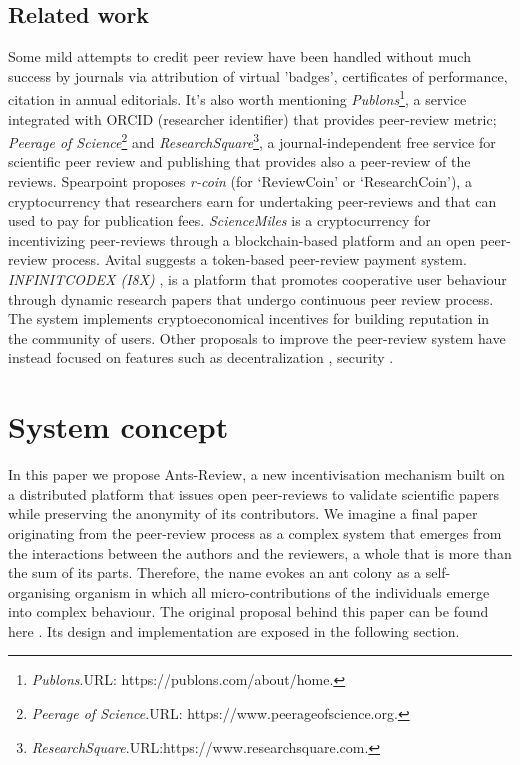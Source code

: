 \documentclass[runningheads]{llncs}
\begin{document}
\subsection{Related work} Some mild attempts to credit peer review have been handled without much success by journals via attribution of virtual 'badges', certificates of performance, citation in annual editorials.
\newline It's also worth mentioning \emph{Publons}\footnote[1]{\emph{Publons}.\textsc{URL:} https://publons.com/about/home.}, a service integrated with ORCID (researcher identifier) that provides peer-review metric; \emph{Peerage of Science}\footnote[2]{\emph{Peerage of Science}.\textsc{URL:} https://www.peerageofscience.org.} and \emph{ResearchSquare}\footnote[3]{\emph{ResearchSquare}.\textsc{URL:}https://www.researchsquare.com.}, a journal-independent free service for scientific peer review and publishing that provides also a peer-review of the reviews. Spearpoint\cite{ResearchCoin} proposes \emph{r-coin} (for ‘ReviewCoin’ or ‘ResearchCoin’), a cryptocurrency that researchers earn for undertaking peer-reviews and that can used to pay for publication fees. \emph{ScienceMiles} \cite{ScienceMiles} is a cryptocurrency for incentivizing peer-reviews through a blockchain-based platform and an open peer-review process. Avital \cite{AvitalToken} suggests a token-based peer-review payment system. \emph{INFINITCODEX (I8X)} \cite{I8X}, is a platform that promotes cooperative user behaviour through dynamic research papers that undergo  continuous peer review process. The system implements cryptoeconomical incentives for building reputation in the community of users. \newline Other proposals to improve the peer-review system have instead focused on features such as decentralization \cite{DecentralSc2,DecentralSc1}, security \cite{Pevo,CryptSubmit,MarsChain}.

\section{System concept}
In this paper we propose Ants-Review, a new incentivisation mechanism built on a distributed platform that issues open peer-reviews to validate scientific papers while preserving the anonymity of its contributors. We imagine a final paper originating from the peer-review process as a complex system that emerges from the interactions between the authors and the reviewers, a whole that is more than the sum of its parts. Therefore, the name evokes an ant colony as a self-organising organism in which all micro-contributions of the individuals emerge into complex behaviour.
\newline The original proposal behind this paper can be found here \cite{AntsReview}.
\newline Its design and implementation are exposed in the following section.
\end{document}

